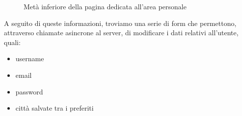\newpage
\begin{figure}[ht]
    \centering
    \caption{Metà inferiore della pagina dedicata all'area personale}
\end{figure}

A seguito di queste informazioni, troviamo una serie di form che permettono, attraverso chiamate asincrone al server, di modificare
i dati relativi all'utente, quali:
\begin{itemize}
    \item username
    \item email
    \item password
    \item città salvate tra i preferiti
\end{itemize}